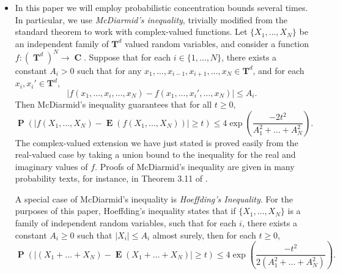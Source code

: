 \documentclass[dvipsnames,letterpaper,12pt]{article}
\numberwithin{equation}{section}
\DeclareMathOperator{\TT}{\mathbf{T}}
\DeclareMathOperator{\CC}{\mathbf{C}}
\numberwithin{theorem}{section}
\DeclareMathOperator{\EE}{\mathbf{E}}
\DeclareMathOperator{\PP}{\mathbf{P}}
\newcommand{\psitwo}[1]{\| {#1} \|_{\psi_2(L)}}
\begin{document}
\begin{itemize}
    \item In this paper we will employ probabilistic concentration bounds several times. In particular, we use \emph{McDiarmid's inequality}, trivially modified from the standard theorem to work with complex-valued functions. Let $\{ X_1, \dots, X_N \}$ be an independent family of $\mathbf{T}^d$ valued random variables, and consider a function $f: (\TT^d)^N \to \CC$. Suppose that for each $i \in \{ 1, \dots, N \}$, there exists a constant $A_i > 0$ such that for any $x_1, \dots, x_{i-1}, x_{i+1}, \dots, x_N \in \mathbf{T}^d$, and for each $x_i, x_i' \in \mathbf{T}^d$,
    \[ |f(x_1, \dots, x_i, \dots, x_N) - f(x_1, \dots, x_i', \dots, x_N)| \leq A_i. \]
    Then McDiarmid's inequality guarantees that for all $t \geq 0$,
    \[ \PP \left( |f(X_1, \dots, X_N) - \EE(f(X_1, \dots, X_N))| \geq t \right) \leq 4 \exp \left( \frac{-2t^2}{A_1^2 + \dots + A_N^2} \right). \]
    The complex-valued extension we have just stated is proved easily from the real-valued case by taking a union bound to the inequality for the real and imaginary values of $f$. Proofs of McDiarmid's inequality are given in many probability texts, for instance, in Theorem 3.11 of \cite{VanHandel}.

    A special case of McDiarmid's inequality is \emph{Hoeffding's Inequality}. For the purposes of this paper, Hoeffding's inequality states that if $\{ X_1, \dots, X_N \}$ is a family of independent random variables, such that for each $i$, there exists a constant $A_i \geq 0$ such that $|X_i| \leq A_i$ almost surely, then for each $t \geq 0$,
    \[ \PP \left( |(X_1 + \dots + X_N) - \EE(X_1 + \dots + X_N)| \geq t \right) \leq 4 \exp \left(\frac{-t^2}{2(A_1^2 + \dots + A_N^2)} \right). \]

    \begin{comment}

    \item Our random construction involves a probabilistic concentration of measure argument. Define a convex function $\psi_2: [0,\infty) \to [0,\infty)$ by setting
    \[ \psi_2(t) = e^{t^2} - 1, \]
    The function $\psi_2$ induces an Orlicz norm on the family of scalar valued random variables over a probability space by setting, for each random variable $X$,
    \[ \psitwo{X} = \inf \left\{ A \in (0,\infty) : \EE(\psi_2(|X|/A)) \leq 1 \right\}. \]
    The family of random variables with $\psitwo{X} < \infty$ are known as \emph{subgaussian random variables}. Here are the important properties of subgaussian random variables which we use in this paper:
    \begin{itemize}
        \item If $\psitwo{X} \leq A$, then for each $t \geq 0$,
        \[ \PP \left( |X| \geq t \right) \leq 10 \exp \left( -t^2/10A^2 \right). \]
        Thus Subgaussian random variables have Gaussian tails.


\end{comment}
\end{itemize}
\end{document}
